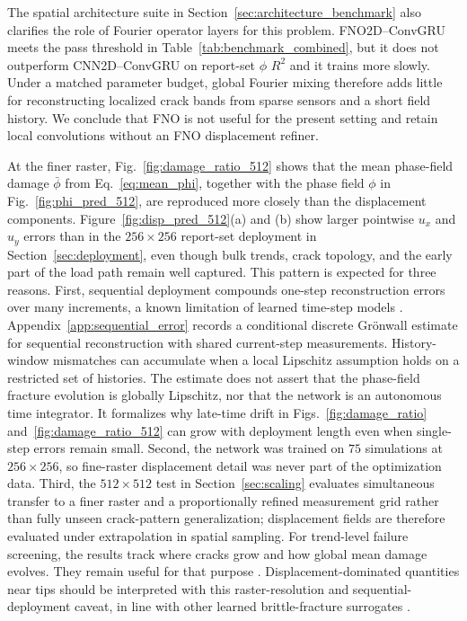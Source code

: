 \documentclass[10pt]{article}
\theoremstyle{definition}
\begin{document}
The spatial architecture suite in Section~\ref{sec:architecture_benchmark} also clarifies the role of Fourier operator layers for this problem.
%
FNO2D--ConvGRU meets the pass threshold in Table~\ref{tab:benchmark_combined}, but it does not outperform CNN2D--ConvGRU on report-set $\phi$ $R^2$ and it trains more slowly.
%
Under a matched parameter budget, global Fourier mixing therefore adds little for reconstructing localized crack bands from sparse sensors and a short field history.
%
We conclude that FNO is not useful for the present setting and retain local convolutions without an FNO displacement refiner.

At the finer raster, Fig.~\ref{fig:damage_ratio_512} shows that the mean phase-field damage $\bar{\phi}$ from Eq.~\eqref{eq:mean_phi}, together with the phase field $\phi$ in Fig.~\ref{fig:phi_pred_512}, are reproduced more closely than the displacement components.
%
Figure~\ref{fig:disp_pred_512}(a) and (b) show larger pointwise $u_x$ and $u_y$ errors than in the $256\times256$ report-set deployment in Section~\ref{sec:deployment}, even though bulk trends, crack topology, and the early part of the load path remain well captured.
%
This pattern is expected for three reasons.
%
First, sequential deployment compounds one-step reconstruction errors over many increments, a known limitation of learned time-step models \cite{geneva2020,goswami2022}.
%
Appendix~\ref{app:sequential_error} records a conditional discrete Gr\"onwall estimate for sequential reconstruction with shared current-step measurements.
%
History-window mismatches can accumulate when a local Lipschitz assumption holds on a restricted set of histories.
%
The estimate does not assert that the phase-field fracture evolution is globally Lipschitz, nor that the network is an autonomous time integrator.
%
It formalizes why late-time drift in Figs.~\ref{fig:damage_ratio} and~\ref{fig:damage_ratio_512} can grow with deployment length even when single-step errors remain small.
%
Second, the network was trained on $75$ simulations at $256\times256$, so fine-raster displacement detail was never part of the optimization data.
%
Third, the $512\times512$ test in Section~\ref{sec:scaling} evaluates simultaneous transfer to a finer raster and a proportionally refined measurement grid rather than fully unseen crack-pattern generalization; displacement fields are therefore evaluated under extrapolation in spatial sampling.
%
For trend-level failure screening, the results track where cracks grow and how global mean damage evolves.
%
They remain useful for that purpose \cite{ambati2015}.
%
Displacement-dominated quantities near tips should be interpreted with this raster-resolution and sequential-deployment caveat, in line with other learned brittle-fracture surrogates \cite{goswami2022}.
\end{document}
